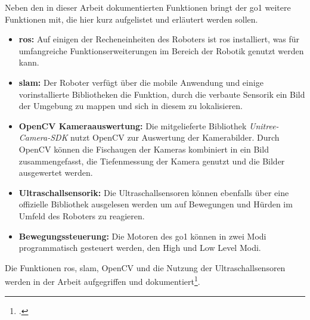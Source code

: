 Neben den in dieser Arbeit dokumentierten Funktionen bringt der \gls{go1} weitere Funktionen mit, die hier kurz
aufgelistet und erläutert werden sollen.

\begin{itemize}
    \item \textbf{\gls{ros}:}
    Auf einigen der Recheneinheiten des Roboters ist \gls{ros} installiert, was für umfangreiche Funktionserweiterungen
    im Bereich der Robotik genutzt werden kann.
    \item \textbf{\gls{slam}:}
    Der Roboter verfügt über die mobile Anwendung und einige vorinstallierte Bibliotheken die Funktion, durch die verbaute
    Sensorik ein Bild der Umgebung zu mappen und sich in diesem zu lokalisieren.
    \item \textbf{OpenCV Kameraauswertung:}
    Die mitgelieferte Bibliothek \emph{Unitree-Camera-SDK} nutzt OpenCV zur Auswertung der Kamerabilder.
    Durch OpenCV können die Fischaugen der Kameras kombiniert in ein Bild zusammengefasst, die Tiefenmessung der Kamera
    genutzt und die Bilder ausgewertet werden.
    \item \textbf{Ultraschallsensorik:}
    Die Ultraschallsensoren können ebenfalls über eine offizielle Bibliothek ausgelesen werden um auf Bewegungen und Hürden
    im Umfeld des Roboters zu reagieren.
    \item \textbf{Bewegungssteuerung:}
    Die Motoren des \gls{go1} können in zwei Modi programmatisch gesteuert werden, den High und Low Level Modi.
\end{itemize}

\noindent Die Funktionen \gls{ros}, \gls{slam}, OpenCV und die Nutzung der Ultraschallsensoren werden in der Arbeit
 aufgegriffen und dokumentiert\footcite{jonas}.